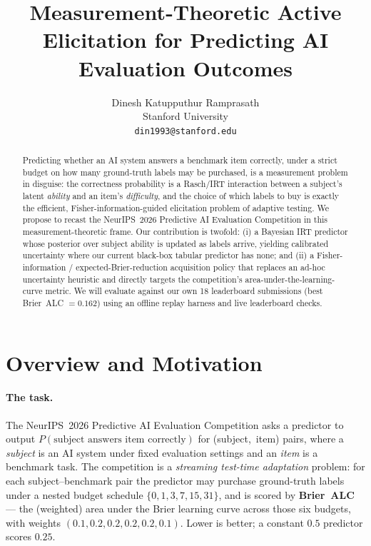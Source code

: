 \documentclass{article}
\title{Measurement-Theoretic Active Elicitation for Predicting AI
Evaluation Outcomes}
\author{%
  Dinesh Katupputhur Ramprasath \\
  Stanford University \\
  \texttt{din1993@stanford.edu} \\
}
\begin{document}
\maketitle

\begin{abstract}
Predicting whether an AI system answers a benchmark item correctly, under a
strict budget on how many ground-truth labels may be purchased, is a
measurement problem in disguise: the correctness probability is a
Rasch/IRT interaction between a subject's latent \emph{ability} and an item's
\emph{difficulty}, and the choice of which labels to buy is exactly the
efficient, Fisher-information-guided elicitation problem of adaptive testing.
We propose to recast the NeurIPS~2026 Predictive AI Evaluation Competition in
this measurement-theoretic frame. Our contribution is twofold: (i) a Bayesian
IRT predictor whose posterior over subject ability is updated as labels arrive,
yielding calibrated uncertainty where our current black-box tabular predictor
has none; and (ii) a Fisher-information / expected-Brier-reduction acquisition
policy that replaces an ad-hoc uncertainty heuristic and directly targets the
competition's area-under-the-learning-curve metric. We will evaluate against our
own 18 leaderboard submissions (best Brier~ALC $=0.162$) using an offline replay
harness and live leaderboard checks.
\end{abstract}

\section{Overview and Motivation}

\paragraph{The task.} The NeurIPS~2026 Predictive AI Evaluation Competition asks
a predictor to output $P(\text{subject answers item correctly})$ for
\mbox{(subject, item)} pairs, where a \emph{subject} is an AI system under fixed
evaluation settings and an \emph{item} is a benchmark task. The competition is a
\emph{streaming test-time adaptation} problem: for each subject--benchmark pair
the predictor may purchase ground-truth labels under a nested budget schedule
$\{0,1,3,7,15,31\}$, and is scored by \textbf{Brier~ALC} --- the (weighted) area
under the Brier learning curve across those six budgets, with weights
$(0.1,0.2,0.2,0.2,0.2,0.1)$. Lower is better; a constant $0.5$ predictor scores
$0.25$.
\end{document}
